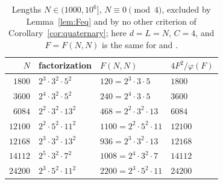 \begin{table}[ht]
\centering
\caption{Lengths $N\in(1000,10^6]$, $N\equiv0\pmod4$, excluded by
Lemma~\ref{lem:Feq} and by no other criterion of
Corollary~\ref{cor:quaternary}; here $d=L=N$, $C=4$, and $F=F(N,N)$ is
the same for \cite[Def.~2.6]{LeungSchmidt2005} and
\cite[Def.~2.10]{LeungSchmidt2012}.}
\label{tab:Feq}
\small
\begin{tabular}{@{}rlll@{}}
\toprule
$N$ & factorization & $F(N,N)$ & $4F^2/\varphi(F)$\\
\midrule
$1800$ & $2^3\cdot3^2\cdot5^2$ & $120=2^3\cdot3\cdot5$ & $1800$\\
$3600$ & $2^4\cdot3^2\cdot5^2$ & $240=2^4\cdot3\cdot5$ & $3600$\\
$6084$ & $2^2\cdot3^2\cdot13^2$ & $468=2^2\cdot3^2\cdot13$ & $6084$\\
$12100$ & $2^2\cdot5^2\cdot11^2$ & $1100=2^2\cdot5^2\cdot11$ & $12100$\\
$12168$ & $2^3\cdot3^2\cdot13^2$ & $936=2^3\cdot3^2\cdot13$ & $12168$\\
$14112$ & $2^5\cdot3^2\cdot7^2$ & $1008=2^4\cdot3^2\cdot7$ & $14112$\\
$24200$ & $2^3\cdot5^2\cdot11^2$ & $2200=2^3\cdot5^2\cdot11$ & $24200$\\
\bottomrule
\end{tabular}
\end{table}
